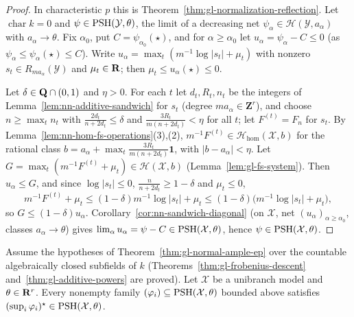 \begin{proof}
In characteristic $p$ this is Theorem~\ref{thm:gl-normalization-reflection}. Let $\operatorname{char}k=0$ and $\psi\in\operatorname{PSH}(\mathcal Y,\theta)$, the limit of a decreasing net
$\psi_\alpha\in\mathcal H(\mathcal Y,a_\alpha)$ with $a_\alpha\to\theta$. Fix $\alpha_0$, put $C=\psi_{\alpha_0}(\star)$, and for $\alpha\ge\alpha_0$ let
$u_\alpha=\psi_\alpha-C\le0$ (as $\psi_\alpha\le\psi_\alpha(\star)\le C$). Write $u_\alpha=\max_t(m^{-1}\log|s_t|+\mu_t)$ with nonzero $s_t\in R_{ma_\alpha}(\mathcal Y)$ and
$\mu_t\in\mathbf{R}$; then $\mu_t\le u_\alpha(\star)\le0$.

Let $\delta\in\mathbf{Q}\cap(0,1)$ and $\eta>0$. For each $t$ let $d_t,R_t,n_t$ be the integers of Lemma~\ref{lem:nn-additive-sandwich} for $s_t$ (degree $ma_\alpha\in\mathbf Z^r$),
and choose $n\ge\max_tn_t$ with $\frac{2d_t}{n+2d_t}\le\delta$ and $\frac{3R_t}{m(n+2d_t)}<\eta$ for all $t$; let $F^{(t)}=F_n$ for $s_t$. By
Lemma~\ref{lem:nn-hom-fs-operations}(3),(2), $m^{-1}F^{(t)}\in\mathcal H_{\mathrm{hom}}(\mathcal X,b)$ for the rational class
$b=a_\alpha+\max_t\frac{3R_t}{m(n+2d_t)}\mathbf1$, with $|b-a_\alpha|<\eta$. Let $G=\max_t(m^{-1}F^{(t)}+\mu_t)\in\mathcal H(\mathcal X,b)$ (Lemma~\ref{lem:gl-fs-system}). Then
$u_\alpha\le G$, and since $\log|s_t|\le0$, $\frac n{n+2d_t}\ge1-\delta$ and $\mu_t\le0$,
\[
m^{-1}F^{(t)}+\mu_t\le(1-\delta)m^{-1}\log|s_t|+\mu_t\le(1-\delta)\bigl(m^{-1}\log|s_t|+\mu_t\bigr),
\]
so $G\le(1-\delta)u_\alpha$. Corollary~\ref{cor:nn-sandwich-diagonal} (on $\mathcal X$, net $(u_\alpha)_{\alpha\ge\alpha_0}$, classes $a_\alpha\to\theta$) gives
$\lim_\alpha u_\alpha=\psi-C\in\operatorname{PSH}(\mathcal X,\theta)$, hence $\psi\in\operatorname{PSH}(\mathcal X,\theta)$.
\end{proof}

\begin{theorem}\label{thm:nn-main}
\leanok
{}
Assume the hypotheses of Theorem~\ref{thm:gl-normal-ample-ep} over the countable algebraically closed subfields of $k$ (Theorems~\ref{thm:gl-frobenius-descent} and~\ref{thm:gl-additive-powers} are proved). Let $\mathcal X$ be a
unibranch model and $\theta\in\mathbf{R}^r$. Every nonempty family $(\varphi_i)\subseteq\operatorname{PSH}(\mathcal X,\theta)$ bounded above satisfies
$(\sup_i\varphi_i)^\star\in\operatorname{PSH}(\mathcal X,\theta)$.
\end{theorem}

